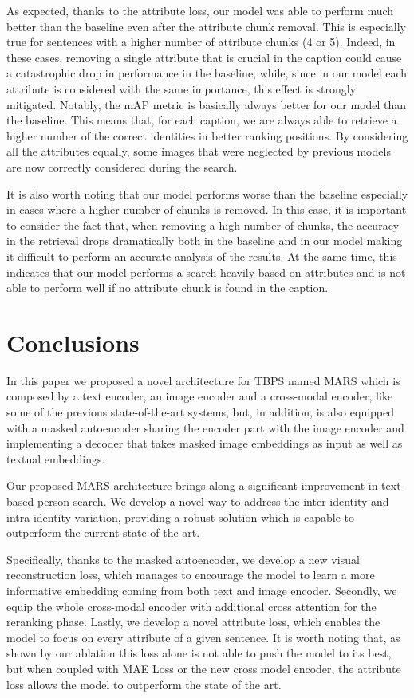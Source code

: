 \documentclass[acmsmall]{acmart}
\begin{document}
As expected, thanks to the attribute loss, our model was able to perform much better than the baseline even after the attribute chunk removal. This is especially true for sentences with a higher number of attribute chunks (4 or 5). Indeed, in these cases, removing a single attribute that is crucial in the caption could cause a catastrophic drop in performance in the baseline, while, since in our model each attribute is considered with the same importance, this effect is strongly mitigated. Notably, the mAP metric is basically always better for our model than the baseline. This means that, for each caption, we are always able to retrieve a higher number of the correct identities in better ranking positions. By considering all the attributes equally, some images that were neglected by previous models are now correctly considered during the search. 

It is also worth noting that our model performs worse than the baseline especially in cases where a higher number of chunks is removed. In this case, it is important to consider the fact that, when removing a high number of chunks, the accuracy in the retrieval drops dramatically both in the baseline and in our model making it difficult to perform an accurate analysis of the results. At the same time, this indicates that our model performs a search heavily based on attributes and is not able to perform well if no attribute chunk is found in the caption. 


\section{Conclusions}
In this paper we proposed a novel architecture for TBPS named MARS which is composed by a text encoder, an image encoder and a cross-modal encoder, like some of the previous state-of-the-art systems, but, in addition, is also equipped with a masked autoencoder sharing the encoder part with the image encoder and implementing a decoder that takes masked image embeddings as input as well as textual embeddings.

Our proposed MARS architecture brings along a significant improvement in text-based person search. We develop a novel way to address the inter-identity and intra-identity variation, providing a robust solution which is capable to outperform the current state of the art.

Specifically, thanks to the masked autoencoder, we develop a new visual reconstruction loss, which manages to encourage the model to learn a more informative embedding coming from both text and image encoder. Secondly, we equip the whole cross-modal encoder with additional cross attention for the reranking phase. Lastly, we develop a novel attribute loss, which enables the model to focus on every attribute of a given sentence. It is worth noting that, as shown by our ablation this loss alone is not able to push the model to its best, but when coupled with MAE Loss or the new cross model encoder, the attribute loss allows the model to outperform the state of the art.
\end{document}
